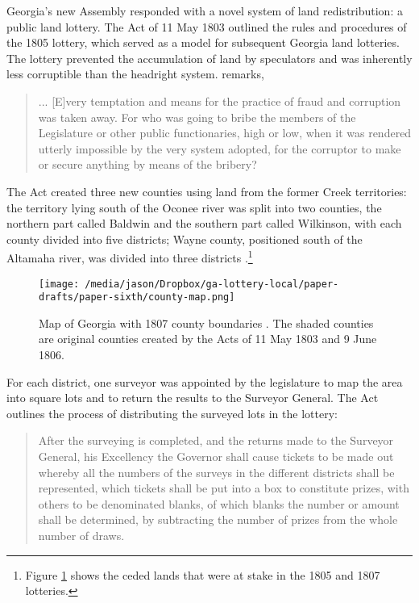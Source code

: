 Georgia's new Assembly responded with a novel system of land redistribution: a public land lottery. The Act of 11 May 1803 outlined the rules and procedures of the 1805 lottery, which served as a model for subsequent Georgia land lotteries. The lottery prevented the accumulation of land by speculators and was inherently less corruptible than the headright system. \citet{chappell1874} remarks, 

\begin{quotation}
	... [E]very temptation and means for the practice of fraud and corruption was taken away. For who was going to bribe the members of the Legislature or other public functionaries, high or low, when it was rendered utterly impossible by the very system adopted, for the corruptor to make or secure anything by means of the bribery?
\end{quotation}

The Act created three new counties using land from the former Creek territories: the territory lying south of the Oconee river was split into two counties, the northern part called Baldwin and the southern part called Wilkinson, with each county divided into five districts; Wayne county, positioned south of the Altamaha river, was divided into three districts \citep{clayton1812}.\footnote{Figure \ref{map} shows the ceded lands that were at stake in the 1805 and 1807 lotteries.}

\begin{figure}[htbp] 
	\centering
	\texttt{[image: /media/jason/Dropbox/ga-lottery-local/paper-drafts/paper-sixth/county-map.png]} 
	\caption{Map of Georgia with 1807 county boundaries \citep{long1995atlas}. The shaded counties are original counties created by the Acts of 11 May 1803 and 9 June 1806.\label{map}}
\end{figure}

For each district, one surveyor was appointed by the legislature to map the area into square lots and to return the results to the Surveyor General. The Act outlines the process of distributing the surveyed lots in the lottery:

\begin{quotation}
	After the surveying is completed, and the returns made to the Surveyor General, his Excellency the Governor shall cause tickets to be made out whereby all the numbers of the surveys in the different districts shall be represented, which tickets shall be put into a box to constitute prizes, with others to be denominated blanks, of which blanks the number or amount shall be determined, by subtracting the number of prizes from the whole number of draws.
\end{quotation} 

